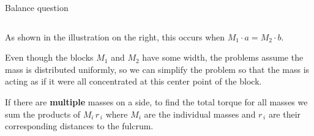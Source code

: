 \documentclass[9pt,aspectratio=169]{beamer}
\begin{document}
\begin{frame}{Balance question}
\begin{columns}[T]
\begin{column}{0.5\textwidth}
\begin{definition}
        As shown in the illustration on the right, this occurs when $M_1 \cdot a = M_2 \cdot b$. 
      \end{definition}

      Even though the blocks $M_1$ and $M_2$  have some width, the problems assume the mass is distributed uniformly, so we can simplify the problem so that the mass is acting as if it were all concentrated at this center point of the block.

      \begin{example}
        If there are \textbf{multiple} masses on a side, to find the total torque for all masses we sum the products of $M_i\, r_{\,i}$ where $M_i$ are the individual masses and $r_{\,i}$ are their corresponding distances to the fulcrum.
      \end{example}
    \end{column}
  \end{columns}
\end{frame}
\end{document}
